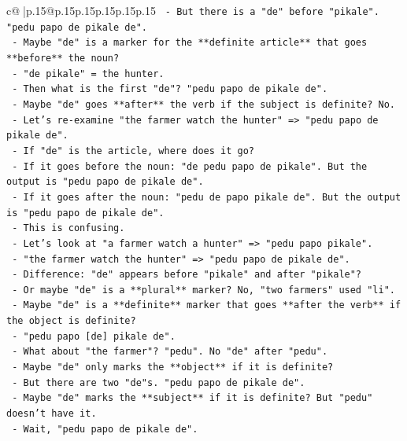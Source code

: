 \documentclass{article}
\begin{document}
{\begin{supertabular}{c@{$\;$}|p{.15\linewidth}@{}p{.15\linewidth}p{.15\linewidth}p{.15\linewidth}p{.15\linewidth}p{.15\linewidth}}
{{{\texttt{           {-} But there is a "de" before "pikale". "pedu papo de pikale de".} \\
\texttt{           {-} Maybe "de" is a marker for the **definite article** that goes **before** the noun?} \\
\texttt{           {-} "de pikale" = the hunter.} \\
\texttt{           {-} Then what is the first "de"? "pedu papo de pikale de".} \\
\texttt{           {-} Maybe "de" goes **after** the verb if the subject is definite? No.} \\
\texttt{           {-} Let's re{-}examine "the farmer watch the hunter" => "pedu papo de pikale de".} \\
\texttt{           {-} If "de" is the article, where does it go?} \\
\texttt{           {-} If it goes before the noun: "de pedu papo de pikale". But the output is "pedu papo de pikale de".} \\
\texttt{           {-} If it goes after the noun: "pedu de papo pikale de". But the output is "pedu papo de pikale de".} \\
\texttt{           {-} This is confusing.} \\
\texttt{           {-} Let's look at "a farmer watch a hunter" => "pedu papo pikale".} \\
\texttt{           {-} "the farmer watch the hunter" => "pedu papo de pikale de".} \\
\texttt{           {-} Difference: "de" appears before "pikale" and after "pikale"?} \\
\texttt{           {-} Or maybe "de" is a **plural** marker? No, "two farmers" used "li".} \\
\texttt{           {-} Maybe "de" is a **definite** marker that goes **after the verb** if the object is definite?} \\
\texttt{           {-} "pedu papo {[}de{]} pikale de".} \\
\texttt{           {-} What about "the farmer"? "pedu". No "de" after "pedu".} \\
\texttt{           {-} Maybe "de" only marks the **object** if it is definite?} \\
\texttt{           {-} But there are two "de"s. "pedu papo de pikale de".} \\
\texttt{           {-} Maybe "de" marks the **subject** if it is definite? But "pedu" doesn't have it.} \\
\texttt{           {-} Wait, "pedu papo de pikale de".} \\
}}}
\end{supertabular}}
\end{document}
